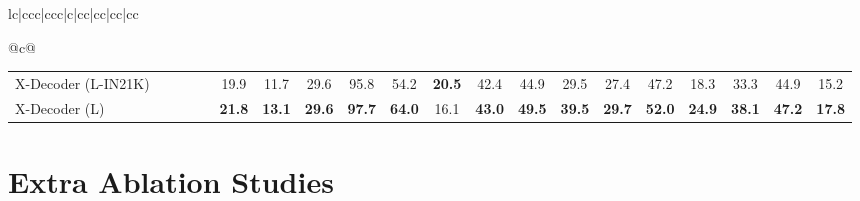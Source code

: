 \documentclass[10pt,twocolumn,letterpaper]{article}
\newcommand{\ourmodel}{X-Decoder}
\begin{document}
\begin{table*}[!ht]
{\begin{tabular}{lc|ccc|ccc|c|cc|cc|cc|cc}
{\begin{tabular}[c]{@{}c@{}}
\begin{table*}[t]
\begin{tabular}{lcccc|ccccccccccccccc}
\hline
X-Decoder (L-IN21K)                                   & \cmark & \cmark   & \cmark                    & \cmark                    & 19.9          & 11.7          & 29.6          & 95.8          & 54.2          & \textbf{20.5}          & 42.4          & 44.9          & 29.5          & 27.4          & 47.2          & 18.3                                     & 33.3                                     & 44.9          & 15.2           \\
\rowcolor[rgb]{0.937,0.937,0.937} X-Decoder (L)                                   & \cmark & \cmark   & \cmark                    & \cmark                    & \textbf{21.8}                            & \textbf{13.1}                            & \textbf{29.6}          & \textbf{97.7}                                     & \textbf{64.0}          & 16.1          & \textbf{43.0} & \textbf{49.5} & \textbf{39.5} & \textbf{29.7} & \textbf{52.0} & \textbf{24.9}                                     & \textbf{38.1}                                     & \textbf{47.2} & \textbf{17.8} \\

\bottomrule
\end{tabular}
\vspace{2pt}
\caption{More open-vocabulary segmentation results. We report the results for our \ourmodel{} pretrained with COCO segmentation and caption annotations only in 3rd row. Additionally, we compare the model initialized with two different pre-trained large vision backbones, FocalNet-Large and DaViT-d5 trained on ImageNet-21K (row 5) and hundreds of millions of image-text pairs (row 6), respectively.}
\label{Tab:zero_shot_sup}
\end{table*}

\section{Extra Ablation Studies}

\end{tabular}}
\end{tabular}}
\end{table*}
\end{document}
